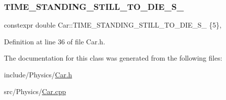 \subsubsection{\texorpdfstring{T\+I\+M\+E\+\_\+\+S\+T\+A\+N\+D\+I\+N\+G\+\_\+\+S\+T\+I\+L\+L\+\_\+\+T\+O\+\_\+\+D\+I\+E\+\_\+\+S\+\_\+}{TIME\_STANDING\_STILL\_TO\_DIE\_S\_}}
{\footnotesize\ttfamily constexpr double Car\+::\+T\+I\+M\+E\+\_\+\+S\+T\+A\+N\+D\+I\+N\+G\+\_\+\+S\+T\+I\+L\+L\+\_\+\+T\+O\+\_\+\+D\+I\+E\+\_\+\+S\+\_\+ \{5\}\hspace{0.3cm}{\ttfamily [static]}, {\ttfamily [private]}}



Definition at line 36 of file Car.\+h.



The documentation for this class was generated from the following files\+:\begin{DoxyCompactItemize}
\item 
include/\+Physics/\hyperlink{Car_8h}{Car.\+h}\item 
src/\+Physics/\hyperlink{Car_8cpp}{Car.\+cpp}\end{DoxyCompactItemize}
